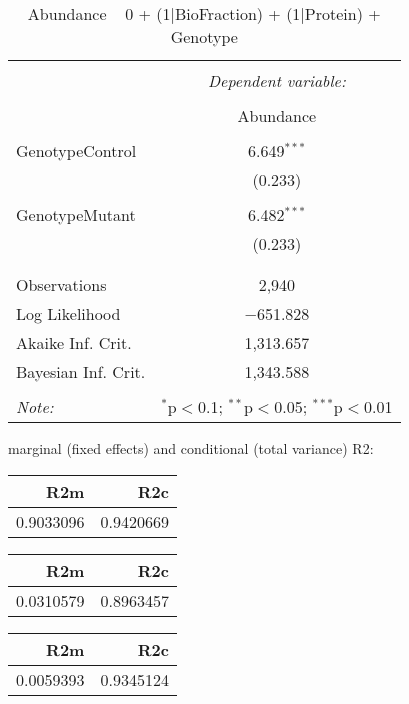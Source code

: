 \documentclass[11pt]{report}
\begin{document}
\begin{table}[!htbp] \centering 
  \caption{Abundance ~ 0 + (1|BioFraction) + (1|Protein) + Genotype} 
  \label{} 
\begin{tabular}{@{\extracolsep{5pt}}lc} 
\\[-1.8ex]\hline 
\hline \\[-1.8ex] 
 & \multicolumn{1}{c}{\textit{Dependent variable:}} \\ 
\cline{2-2} 
\\[-1.8ex] & Abundance \\ 
\hline \\[-1.8ex] 
 GenotypeControl & 6.649$^{***}$ \\ 
  & (0.233) \\ 
  & \\ 
 GenotypeMutant & 6.482$^{***}$ \\ 
  & (0.233) \\ 
  & \\ 
\hline \\[-1.8ex] 
Observations & 2,940 \\ 
Log Likelihood & $-$651.828 \\ 
Akaike Inf. Crit. & 1,313.657 \\ 
Bayesian Inf. Crit. & 1,343.588 \\ 
\hline 
\hline \\[-1.8ex] 
\textit{Note:}  & \multicolumn{1}{r}{$^{*}$p$<$0.1; $^{**}$p$<$0.05; $^{***}$p$<$0.01} \\ 
\end{tabular} 
\end{table} 
marginal (fixed effects) and conditional (total variance) R2:

\begin{tabular}{r|r}
\hline
R2m & R2c\\
\hline
0.9033096 & 0.9420669\\
\hline
\end{tabular}

\begin{tabular}{r|r}
\hline
R2m & R2c\\
\hline
0.0310579 & 0.8963457\\
\hline
\end{tabular}

\begin{tabular}{r|r}
\hline
R2m & R2c\\
\hline
0.0059393 & 0.9345124\\
\hline
\end{tabular}
\end{document}
